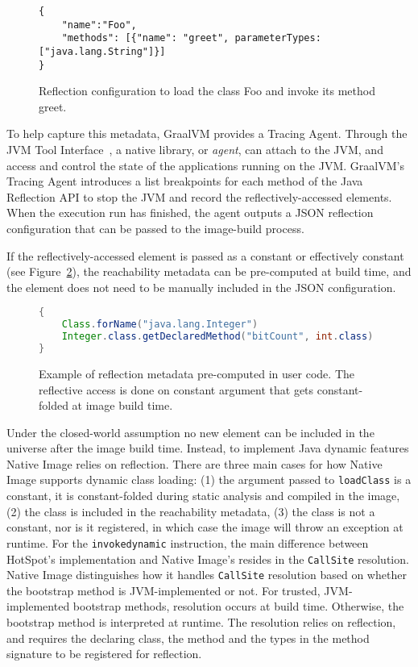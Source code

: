 \begin{figure}[ht]
    \centering
\begin{lstlisting}
{
    "name":"Foo",
    "methods": [{"name": "greet", parameterTypes: ["java.lang.String"]}]
}    
\end{lstlisting}
    \caption{Reflection configuration to load the class Foo and invoke its method greet.}
    \label{fig:reflect_config}
\end{figure}

To help capture this metadata, GraalVM provides a Tracing Agent. Through the JVM Tool Interface~\cite{noauthor_jvmtm_nodate}, a native library, or \emph{agent}, can attach to the JVM, and access and control the state of the applications running on the JVM. GraalVM's Tracing Agent introduces a list breakpoints for each method of the Java Reflection API to stop the JVM and record the reflectively-accessed elements. When the execution run has finished, the agent outputs a JSON reflection configuration that can be passed to the image-build process.   

If the reflectively-accessed element is passed as a constant or effectively constant (see Figure~\ref{fig:computing_reflection_metadata_in_code_code}), the reachability metadata can be pre-computed at build time, and the element does not need to be manually included in the JSON configuration. 

\begin{figure}[ht]
    \centering
\begin{lstlisting}[language=Java]
{
    Class.forName("java.lang.Integer")
    Integer.class.getDeclaredMethod("bitCount", int.class)
}    
\end{lstlisting}
    \caption{Example of reflection metadata pre-computed in user code. The reflective access is done on constant argument that gets constant-folded at image build time.}
    \label{fig:computing_reflection_metadata_in_code_code}
\end{figure}

Under the closed-world assumption no new element can be included in the universe after the image build time. Instead, to implement Java dynamic features Native Image relies on reflection. 
There are three main cases for how Native Image supports dynamic class loading: (1) the argument passed to \verb|loadClass| is a constant, it is constant-folded during static analysis and compiled in the image, (2) the class is included in the reachability metadata, (3) the class is not a constant, nor is it registered, in which case the image will throw an exception at runtime.
For the \verb|invokedynamic| instruction, the main difference between HotSpot's implementation and Native Image's resides in the \verb|CallSite| resolution. Native Image distinguishes how it handles \verb|CallSite| resolution based on whether the bootstrap method is JVM-implemented or not. For trusted, JVM-implemented bootstrap methods, resolution occurs at build time. Otherwise, the bootstrap method is interpreted at runtime. The resolution relies on reflection, and requires the declaring class, the method and the types in the method signature to be registered for reflection.